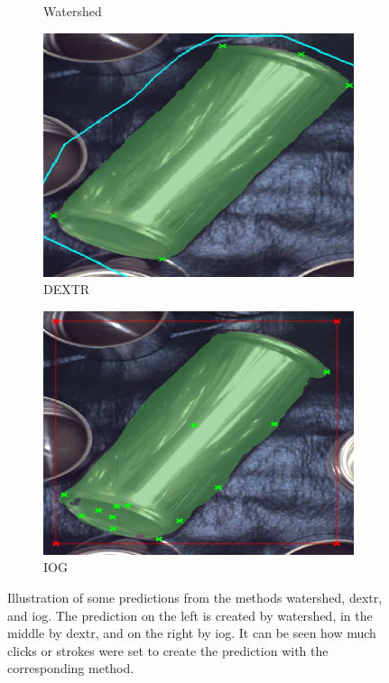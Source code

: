 \begin{figure}
\begin{subfigure}[t]{0.3\textwidth}
		\caption{
			Watershed
		}
	\end{subfigure}
	\hfill
	\begin{subfigure}[t]{0.3\textwidth}
		\centering
		\includegraphics[width=\textwidth]{figures/appendix/method_predictions/cans75_dextr.png}
		\caption{
			DEXTR
		}
	\end{subfigure}
	\hfill
	\begin{subfigure}[t]{0.3\textwidth}
		\centering
		\includegraphics[width=\textwidth]{figures/appendix/method_predictions/cans75_iog.png}
		\caption{
			IOG
		}
	\end{subfigure}
	\caption[Predictions from watershed, DEXTR, and IOG]{
		Illustration of some predictions from the methods watershed, \gls{dextr}, and \gls{iog}.
		The prediction on the left is created by watershed, in the middle by \gls{dextr}, and on the right by \gls{iog}.
		It can be seen how much clicks or strokes were set to create the prediction with the corresponding method.
	}\label{fig:appendix_model_predictions}
\end{figure}
	
